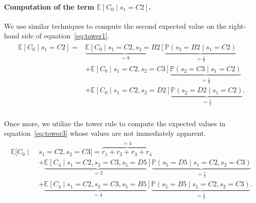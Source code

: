 \paragraph{Computation of the term $\mathbb{E}\left[ C_0 \mid s_1 = C2
 \right]$.} 
%
We use similar techniques to compute the second expected value on the right-hand 
side of equation~\eqref{eq:tower1}.
%
\begin{align}
    \begin{split}
    \mathbb{E}\left[ C_0 \mid s_1 = C2 \right] =
    &\underbrace{\mathbb{E}[C_0 \mid s_1 = C2, s_2 = B2]}_{=8} \underbrace{\mathbb{P}(s_2 = B2 \mid s_1 = C2)}_{=\frac{1}{3}} \\
    &+ \mathbb{E}[C_0 \mid s_1=C2, s_2 = C3] \underbrace{\mathbb{P}(s_2 = C3 \mid s_1 = C2)}_{=\frac{1}{3}} \\
    &+ \mathbb{E}[C_0 \mid s_1 = C2, s_2 = D2] \underbrace{\mathbb{P}(s_2 = D2 \mid s_1 = C2)}_{=\frac{1}{3}}.
    \end{split}
    \label{eq:tower3}
\end{align}
%
\hphantom{aha} \\[-1ex]
%
Once more, we utilize the tower rule to compute the expected values in
equation~\eqref{eq:tower3} whose values are not immediately apparent.
%
\begin{align*}
    \begin{split}
    \mathbb{E}[C_0 \mid \; &s_1=C2, s_2=C3] = \overbrace{r_1 + r_2 + r_3 + r_4}^{=4} \\
    &+ \underbrace{\mathbb{E}[C_4 \mid s_1=C2, s_2=C3, s_5=D5]}_{=2} \underbrace{\mathbb{P}(s_5=D5 \mid s_1=C2, s_2=C3)}_{=\frac{1}{2}} \\
    &+ \underbrace{\mathbb{E}[C_4 \mid s_1=C2, s_2=C3, s_5=B5]}_{=4} \underbrace{\mathbb{P}(s_5=B5 \mid s_1=C2, s_2=C3)}_{=\frac{1}{2}}.
    \end{split}
\end{align*}
